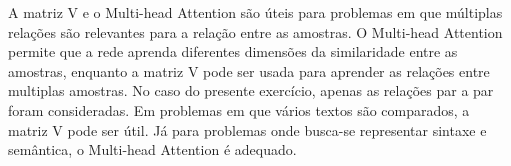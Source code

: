 A matriz V e o Multi-head Attention são úteis para problemas em que múltiplas relações são relevantes para a relação entre as amostras. O Multi-head Attention
permite que a rede aprenda diferentes dimensões da similaridade entre as amostras, enquanto a matriz V pode ser usada para aprender as relações entre multiplas amostras.
No caso do presente exercício, apenas as relações par a par foram consideradas. Em problemas em que vários textos são comparados, a matriz V pode ser útil.
Já para problemas onde busca-se representar sintaxe e semântica, o Multi-head Attention é adequado.
